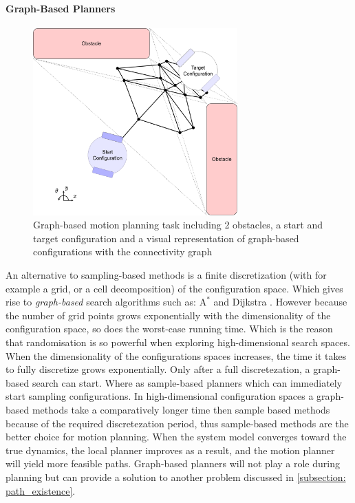 \paragraph{Graph-Based Planners}

\begin{figure}[H]
    \centering
    \includegraphics[width=0.7\textwidth]{figures/robot_motion_planning_graph.png}
    \caption{Graph-based motion planning task including 2 obstacles, a start and target configuration and a visual representation of graph-based configurations with the connectivity graph}
    \label{figure: single_body_motion_task_graph}
\end{figure}

An alternative to sampling-based methods is a finite discretization (with for example a grid, or a cell decomposition) of the configuration space.  Which gives rise to \textit{graph-based} search algorithms such as: $\text{A}^*$ and Dijkstra \cite{karaman_sampling-based_2011}. However because the number of grid points grows exponentially with the dimensionality of the configuration space, so does the worst-case running time. Which is the reason that randomisation is so powerful when exploring high-dimensional search spaces. \\ 

When the dimensionality of the configurations spaces increases, the time it takes to fully discretize grows exponentially. Only after a full discretezation, a graph-based search can start. Where as sample-based planners which can immediately start sampling configurations. In high-dimensional configuration spaces a graph-based methods take a comparatively longer time then sample based methods because of the required discretezation period, thus sample-based methods are the better choice for motion planning. When the system model converges toward the true dynamics, the local planner improves as a result, and the motion planner will yield more feasible paths. Graph-based planners will not play a role during planning but can provide a solution to another problem discussed in \cref{subsection: path_existence}.

